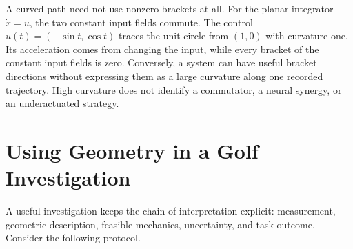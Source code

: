 \documentclass[12pt, openany]{book}
\theoremstyle{plain}
\begin{document}
A curved path need not use nonzero brackets at all. For the planar integrator
$\dot x=u$, the two constant input fields commute. The control
$u(t)=(-\sin t,\cos t)$ traces the unit circle from $(1,0)$ with curvature
one. Its acceleration comes from changing the input, while every bracket of
the constant input fields is zero. Conversely, a system can have useful
bracket directions without expressing them as a large curvature along one
recorded trajectory. High curvature does not identify a commutator, a neural
synergy, or an underactuated strategy.

\section{Using Geometry in a Golf Investigation}

A useful investigation keeps the chain of interpretation explicit:
measurement, geometric description, feasible mechanics, uncertainty, and
task outcome. Consider the following protocol.
\end{document}
